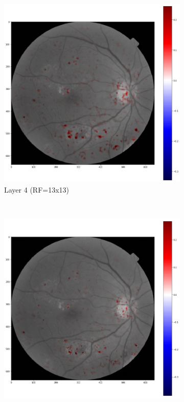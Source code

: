 \documentclass[review]{elsarticle}
\theoremstyle{definition} %
\theoremstyle{remark}
\begin{document}
\begin{figure}[!ht]
	\centering
	\begin{subfigure}{0.45\textwidth}
		\includegraphics[width=\textwidth]{./figures/maps/rf13c.png}
		\caption{Layer 4 (RF=13x13)}
		\label{fig:score_rf13}
	\end{subfigure}
	~ %
	\begin{subfigure}{0.45\textwidth}
		\includegraphics[width=\textwidth]{./figures/maps/rf9c.png}

\end{subfigure}
\end{figure}
\end{document}
